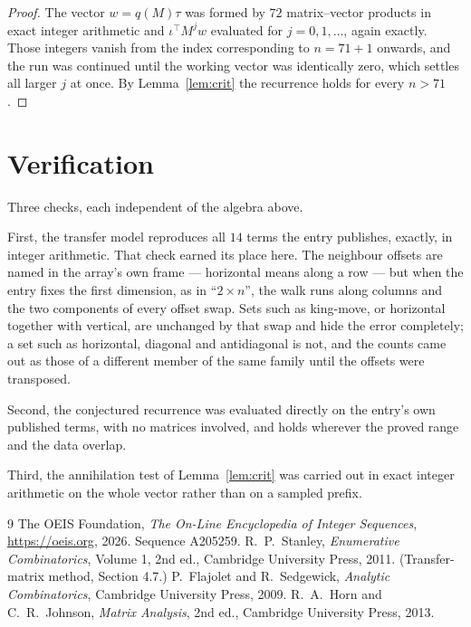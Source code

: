 \documentclass[11pt,a4paper]{article}
\theoremstyle{plain}
\theoremstyle{definition}
\begin{document}
\begin{proof}
The vector $w=q(M)\tau$ was formed by $72$ matrix--vector products in exact integer
arithmetic and $\iota^{\!\top}M^{j}w$ evaluated for $j=0,1,\dots$, again exactly. Those
integers vanish from the index corresponding to $n=71+1$ onwards, and the run was
continued until the working vector was identically zero, which settles all larger $j$ at once.
By Lemma~\ref{lem:crit} the recurrence holds for every $n>71$.
\end{proof}

\section{Verification}

Three checks, each independent of the algebra above.

First, the transfer model reproduces all $14$ terms the entry publishes, exactly, in
integer arithmetic. That check earned its place here. The neighbour offsets are named in the
array's own frame --- horizontal means along a row --- but when the entry fixes the first
dimension, as in ``$2\times n$'', the walk runs along columns and the two components of every
offset swap. Sets such as king-move, or horizontal together with vertical, are unchanged by
that swap and hide the error completely; a set such as horizontal, diagonal and antidiagonal
is not, and the counts came out as those of a different member of the same family until the
offsets were transposed.

Second, the conjectured recurrence was evaluated directly on the entry's own published terms,
with no matrices involved, and holds wherever the proved range and the data overlap.

Third, the annihilation test of Lemma~\ref{lem:crit} was carried out in exact integer
arithmetic on the whole vector rather than on a sampled prefix.

\begin{thebibliography}{9}
 The OEIS Foundation, \emph{The On-Line Encyclopedia of Integer
Sequences}, \url{https://oeis.org}, 2026. Sequence A205259.
 R.~P.~Stanley, \emph{Enumerative Combinatorics}, Volume 1, 2nd ed.,
Cambridge University Press, 2011. (Transfer-matrix method, Section 4.7.)
 P.~Flajolet and R.~Sedgewick, \emph{Analytic Combinatorics}, Cambridge
University Press, 2009.
 R.~A.~Horn and C.~R.~Johnson, \emph{Matrix Analysis}, 2nd ed., Cambridge
University Press, 2013.
\end{thebibliography}
\end{document}
